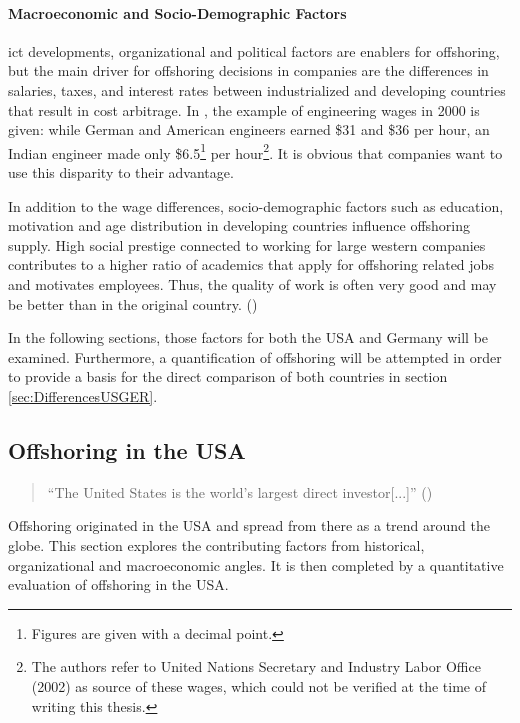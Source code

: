 \paragraph{Macroeconomic and Socio-Demographic Factors}
\Gls{ict} developments, organizational and political factors are enablers for offshoring, but the main driver for offshoring decisions in companies are the differences in salaries, taxes, and interest rates between industrialized and developing countries that result in cost arbitrage. In \cite[p. 89]{Jahns.2007}, the example of engineering wages in 2000 is given: while German and American engineers earned \$31 and \$36 per hour, an Indian engineer made only \$6.5\footnote{Figures are given with a decimal point.} per hour\footnote{The authors refer to United Nations Secretary and Industry Labor Office (2002) as source of these wages, which could not be verified at the time of writing this thesis.}. It is obvious that companies want to use this disparity to their advantage.

In addition to the wage differences, socio-demographic factors such as education, motivation and age distribution in developing countries influence offshoring supply. High social prestige connected to working for large western companies contributes to a higher ratio of academics that apply for offshoring related jobs and motivates employees. Thus, the quality of work is often very good and may be better than in the original country. (\cite[p. 93]{Jahns.2007})

In the following sections, those factors for both the USA and Germany will be examined. Furthermore, a quantification of offshoring will be attempted in order to provide a basis for the direct comparison of both countries in section \ref{sec:DifferencesUSGER}.
\newpage
\subsection{Offshoring in the USA}
\label{sec:OffshoringUS}

\begin{quote}
	``The United States is the world's largest direct investor[...]'' \linebreak(\cite[p. 3]{Kozlow.2006})
\end{quote}

Offshoring originated in the USA and spread from there as a trend around the globe. This section explores the contributing factors from historical, organizational and macroeconomic angles. It is then completed by a quantitative evaluation of offshoring in the USA.

